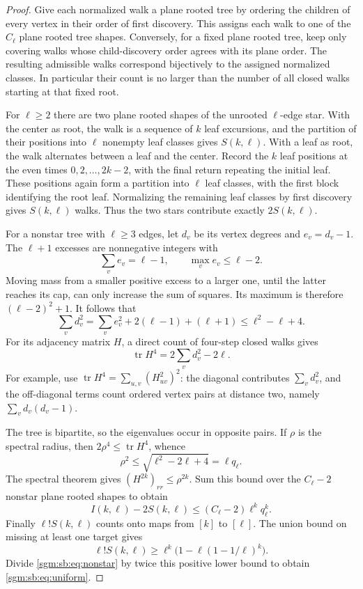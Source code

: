 \documentclass[11pt,letterpaper]{article}
\theoremstyle{remark}\newtheorem{remark}[theorem]{Remark}
\DeclareMathOperator{\tr}{tr}
\theoremstyle{definition}\newtheorem{definition}[theorem]{Definition}
\begin{document}
\begin{proof}
Give each normalized walk a plane rooted tree by ordering the children of every vertex in their order of first discovery. This assigns each walk to one of the $C_\ell$ plane rooted tree shapes. Conversely, for a fixed plane rooted tree, keep only covering walks whose child-discovery order agrees with its plane order. The resulting admissible walks correspond bijectively to the assigned normalized classes. In particular their count is no larger than the number of all closed walks starting at that fixed root.

For $\ell\ge2$ there are two plane rooted shapes of the unrooted $\ell$-edge star. With the center as root, the walk is a sequence of $k$ leaf excursions, and the partition of their positions into $\ell$ nonempty leaf classes gives $S(k,\ell)$. With a leaf as root, the walk alternates between a leaf and the center. Record the $k$ leaf positions at the even times $0,2,\ldots,2k-2$, with the final return repeating the initial leaf. These positions again form a partition into $\ell$ leaf classes, with the first block identifying the root leaf. Normalizing the remaining leaf classes by first discovery gives $S(k,\ell)$ walks. Thus the two stars contribute exactly $2S(k,\ell)$.

For a nonstar tree with $\ell\ge3$ edges, let $d_v$ be its vertex degrees and $e_v=d_v-1$. The $\ell+1$ excesses are nonnegative integers with
\[
 \sum_v e_v=\ell-1,\qquad \max_v e_v\le\ell-2.
\]
Moving mass from a smaller positive excess to a larger one, until the latter reaches its cap, can only increase the sum of squares. Its maximum is therefore $(\ell-2)^2+1$. It follows that
\[
 \sum_v d_v^2=\sum_v e_v^2+2(\ell-1)+(\ell+1)
             \le\ell^2-\ell+4.
\]
For its adjacency matrix $H$, a direct count of four-step closed walks gives
\[
 \tr H^4=2\sum_v d_v^2-2\ell.
\]
For example, use $\tr H^4=\sum_{u,v}(H^2_{uv})^2$: the diagonal contributes $\sum_v d_v^2$, and the off-diagonal terms count ordered vertex pairs at distance two, namely $\sum_v d_v(d_v-1)$.

The tree is bipartite, so the eigenvalues occur in opposite pairs. If $\rho$ is the spectral radius, then $2\rho^4\le\tr H^4$, whence
\[
 \rho^2\le\sqrt{\ell^2-2\ell+4}=\ell q_\ell.
\]
The spectral theorem gives $(H^{2k})_{rr}\le\rho^{2k}$. Sum this bound over the $C_\ell-2$ nonstar plane rooted shapes to obtain
\begin{equation}\label{sgm:sb:eq:nonstar}
 I(k,\ell)-2S(k,\ell)\le(C_\ell-2)\ell^kq_\ell^k.
\end{equation}
Finally $\ell!S(k,\ell)$ counts onto maps from $[k]$ to $[\ell]$. The union bound on missing at least one target gives
\[
 \ell!S(k,\ell)\ge\ell^k\bigl(1-\ell(1-1/\ell)^k\bigr).
\]
Divide \eqref{sgm:sb:eq:nonstar} by twice this positive lower bound to obtain \eqref{sgm:sb:eq:uniform}.


\end{proof}
\end{document}
